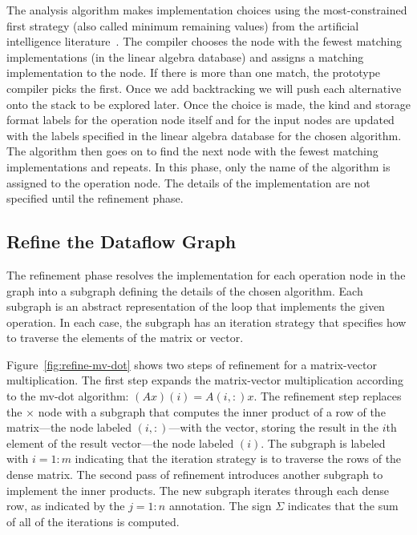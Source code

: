 \documentclass[11pt]{article}
\begin{document}
The analysis algorithm makes implementation choices using the most-constrained first strategy (also called minimum remaining values)
from the artificial intelligence literature~\cite{Russell:2003mz}.
The compiler chooses the node with the fewest matching implementations (in the linear algebra database) and assigns a matching implementation to the node.  If there is more than one match, the prototype compiler picks the first.  Once we add backtracking we will push each alternative onto the stack to be explored later. Once the choice is made, the kind and storage format labels for the operation node itself and for the input nodes are updated with the labels specified in the linear algebra database for the chosen algorithm. The algorithm then goes on to find the next node with the fewest matching implementations and repeats.  In this phase, only the name of the algorithm is assigned to the operation node.  The details of the implementation are not specified until the refinement phase.


\subsection{Refine the Dataflow Graph}
\label{sec:refine}

The refinement phase resolves the implementation for each operation node in the graph into a subgraph defining the details of the chosen algorithm.  Each subgraph is an abstract representation of the loop that implements the given operation.  In each case, the subgraph has an iteration strategy that specifies how to traverse the elements of the matrix or vector.

Figure~\ref{fig:refine-mv-dot} shows two steps of refinement for a matrix-vector multiplication. The first step expands the matrix-vector multiplication according to the mv-dot algorithm: $(Ax)(i) = A(i,:)x$.  The refinement step replaces the $\times$ node with a subgraph that computes the inner product of a row of the matrix---the node labeled $(i,:)$---with the vector, storing the result in the $i$th element of the result vector---the node labeled $(i)$. The subgraph is labeled with $i=1\!:\!m$ indicating that the iteration strategy is to traverse the rows of the dense matrix.
%
The second pass of refinement introduces another subgraph to implement the inner products. The new subgraph iterates through each dense row, as indicated by the $j=1:n$ annotation. The sign $\Sigma$ indicates that the sum of all of the iterations is computed.
\end{document}
